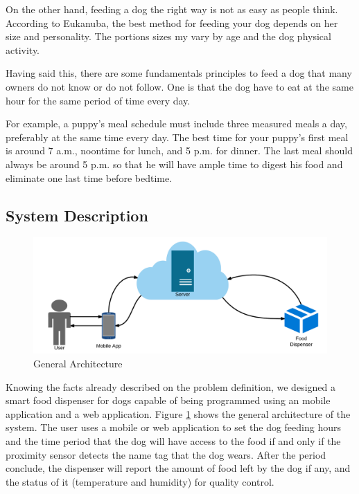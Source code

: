 \documentclass[12pt]{article}
\begin{document}
On the other hand, feeding a dog the right way is not as easy as people think. According to Eukanuba\cite{Eukanuba2016}, the best method for feeding your dog depends on her size and personality. The portions sizes my vary by age and the dog physical activity.

Having said this, there are some fundamentals principles to feed a dog that many owners do not know or do not follow. One is that the dog have to eat at the same hour for the same period of time every day.

For example, a puppy’s meal schedule must include three measured meals a day, preferably at the same time every day. The best time for your puppy’s first meal is around 7 a.m., noontime for lunch, and 5 p.m. for dinner. The last meal should always be around 5 p.m. so that he will have ample time to digest his food and eliminate one last time before bedtime.

\subsection{System Description}

\begin{figure}[!htb]
  \includegraphics[width=\textwidth]{Figures/GeneralArchitecture}
  \caption{General Architecture}
  \label{fig:GeneralArchitecture}
\end{figure}

Knowing the facts already described on the problem definition, we designed a smart food dispenser for dogs capable of being programmed using an mobile application and a web application. Figure \ref{fig:GeneralArchitecture} shows the general architecture of the system. The user uses a mobile or web application to set the dog feeding hours and the time period that the dog will have access to the food if and only if the proximity sensor detects the name tag that the dog wears. After the period conclude, the dispenser will report the amount of food left by the dog if any, and the status of it (temperature and humidity) for quality control.
\end{document}
